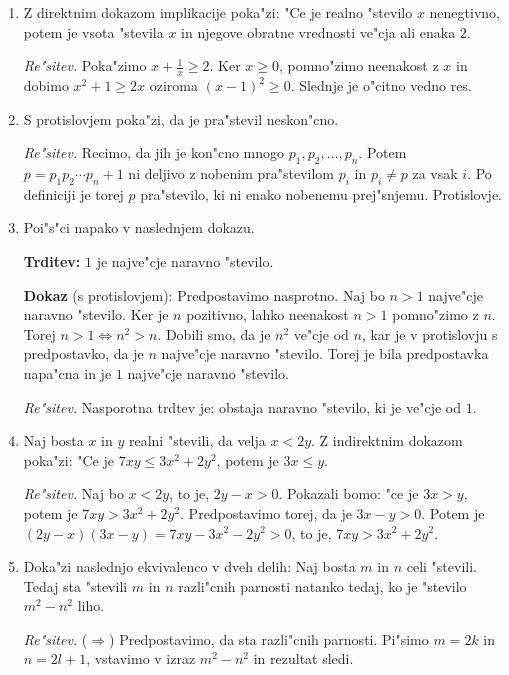 \documentclass[11pt,paper=b5,footinclude,headinclude]{scrbook} %
\theoremstyle{remark}
\theoremstyle{definition} %
\theoremstyle{theorem} %
\begin{document}
\begin{enumerate}
\item Z direktnim dokazom implikacije poka"zi: "Ce je realno "stevilo $x$ nenegtivno, potem je vsota  "stevila $x$  in njegove obratne vrednosti  ve"cja ali enaka $2$.


\emph{ Re"sitev.} Poka"zimo $x + \frac{1}{x}\geq 2$. Ker $x\geq 0$, pomno"zimo neenakost z $x$ in dobimo
$x^2 + 1 \geq 2x$ oziroma $(x- 1)^2\geq 0$. Slednje je o"citno vedno res.

\item S protislovjem poka"zi, da je pra"stevil neskon"cno.

\emph{ Re"sitev.} Recimo, da jih je kon"cno mnogo $p_1,p_2,\ldots, p_n$. Potem  $p=p_1p_2\cdots p_n+1$ ni deljivo z nobenim pra"stevilom $p_i$ in $p_i\neq p$ za vsak $i$. Po definiciji je torej $p$ pra"stevilo, ki ni enako nobenemu prej"snjemu. Protislovje.

\item Poi"s"ci napako v naslednjem dokazu. 

\textbf{Trditev:} $1$ je najve"cje naravno "stevilo. 

\textbf{Dokaz} (s protislovjem):
Predpostavimo nasprotno. Naj bo $n>1$ najve"cje naravno "stevilo. Ker je $n$ pozitivno, lahko neenakost $n>1$ pomno"zimo z $n$. Torej $n>1\Leftrightarrow n^2>n$. Dobili smo, da je $n^2$ ve"cje od $n$, kar je v protislovju s predpostavko, da je $n$ najve"cje naravno "stevilo. Torej je bila predpostavka napa"cna in je $1$ najve"cje naravno "stevilo.

\emph{ Re"sitev.} Nasporotna trdtev je: obstaja naravno "stevilo, ki je ve"cje od $1$.


\item Naj bosta $x$ in $y$ realni "stevili, da velja $x<2y$. Z indirektnim dokazom poka"zi: "Ce je $7xy\leq 3x^2 + 2y^2$, potem je $3x\leq y$.

\emph{ Re"sitev.} Naj bo $x<2y$, to je, $2y-x>0$. Pokazali bomo: "ce je $3x> y$, potem je $7xy > 3x^2 + 2y^2$. Predpostavimo torej, da je $3x-y>0$. Potem je $(2y-x)(3x-y)= 7xy - 3x^2 - 2y^2>0$, to je, $7xy > 3x^2 + 2y^2$.

\item Doka"zi naslednjo ekvivalenco v dveh delih: Naj bosta $m$ in $n$ celi "stevili. Tedaj sta "stevili $m$ in $n$ razli"cnih parnosti natanko tedaj, ko je "stevilo $m^2- n^2$ liho.

\emph{ Re"sitev.} ($\Rightarrow$) Predpostavimo, da sta razli"cnih parnosti. Pi"simo  $m=2k$ in $n=2l+1$, vstavimo v izraz $m^2- n^2$ in rezultat sledi.


\end{enumerate}
\end{document}

